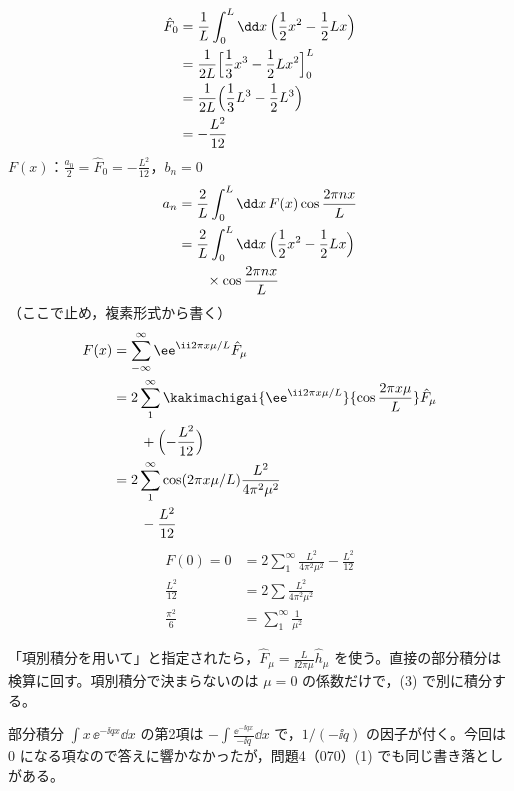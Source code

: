 \begin{align*}
  \hat{F}_0&=\frac{1}{L}\int_{0}^{L}\dd x\,\Bigl(\frac{1}{2}x^{2}-\frac{1}{2}Lx\Bigr)\\
  &=\frac{1}{2L}\Bigl[\frac{1}{3}x^{3}-\frac{1}{2}Lx^{2}\Bigr]_{0}^{L}\\
  &=\frac{1}{2L}\Bigl(\frac{1}{3}L^{3}-\frac{1}{2}L^{3}\Bigr)\\
  &=-\frac{L^{2}}{12}
\end{align*}
$F(x)$：$\frac{a_0}{2}=\hat{F}_0=-\frac{L^{2}}{12}$，$b_n=0$
\begin{align*}
  a_n&=\frac{2}{L}\int_{0}^{L}\dd x\,F(x)\cos\frac{2\pi nx}{L}\\
  &=\frac{2}{L}\int_{0}^{L}\dd x\,\Bigl(\frac{1}{2}x^{2}-\frac{1}{2}Lx\Bigr)\\
  &\qquad\times\cos\frac{2\pi nx}{L}
\end{align*}
（ここで止め，複素形式から書く）
\begin{align*}
  F(x)&=\sum_{-\infty}^{\infty}\ee^{\ii2\pi x\mu/L}\hat{F}_{\mu}\\
  &=2\sum_{1}^{\infty}\kakimachigai{\ee^{\ii2\pi x\mu/L}}{\cos\frac{2\pi x\mu}{L}}\hat{F}_{\mu}\\
  &\qquad+\Bigl(-\frac{L^{2}}{12}\Bigr)\\
  &=2\sum_{1}^{\infty}\cos(2\pi x\mu/L)\frac{L^{2}}{4\pi^{2}\mu^{2}}\\
  &\qquad-\frac{L^{2}}{12}
\end{align*}
\begin{align*}
  F(0)=0&=2\sum_{1}^{\infty}\frac{L^{2}}{4\pi^{2}\mu^{2}}-\frac{L^{2}}{12}\\
  \frac{L^{2}}{12}&=2\sum\frac{L^{2}}{4\pi^{2}\mu^{2}}\\
  \frac{\pi^{2}}{6}&=\sum_{1}^{\infty}\frac{1}{\mu^{2}}
\end{align*}
\item 「項別積分を用いて」と指定されたら，$\hat{F}_{\mu}=\frac{L}{\ii2\pi\mu}\hat{h}_{\mu}$ を使う。直接の部分積分は検算に回す。項別積分で決まらないのは $\mu=0$ の係数だけで，(3) で別に積分する。
\item 部分積分 $\int x\,\ee^{-\ii qx}\dd x$ の第2項は $-\int\frac{\ee^{-\ii qx}}{-\ii q}\dd x$ で，$1/(-\ii q)$ の因子が付く。今回は 0 になる項なので答えに響かなかったが，問題4（070）(1) でも同じ書き落としがある。
